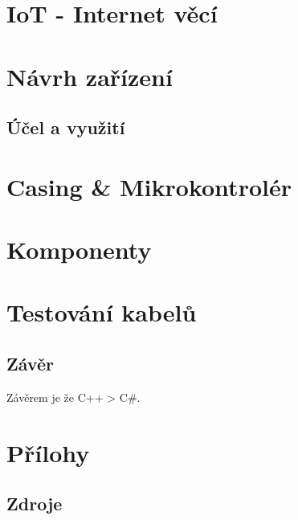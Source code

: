 \documentclass[12pt,a4paper,titlepage]{scrreprt}
\begin{document}
	\chapter{IoT - Internet věcí}
	
	
	\chapter{Návrh zařízení}
	\section{Účel a využití}
	
	\chapter{Casing \& Mikrokontrolér}
	
	\chapter{Komponenty}
	
	\chapter{Testování kabelů}
	
	
	 \section*{Závěr}
	Závěrem je že C++ > C\#.

	\newpage
	\chapter{Přílohy}
	\section*{Zdroje}
	\listoffigures
	\listoftables
	\lstlistoflistings
\end{document}
